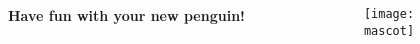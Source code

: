 \DarkBG
\begin{frame}[plain]%
	\begin{columns}
		\hfill
		\begin{column}{.4\linewidth}
			\Huge\color{background-local}\textbf{Have fun with your new penguin!}
		\end{column}
		\hfill
		\begin{column}{.4\linewidth}
			\texttt{[image: \\mascot]}%
		\end{column}
		\hfill
	\end{columns}
\end{frame}%
\ResetBG%
